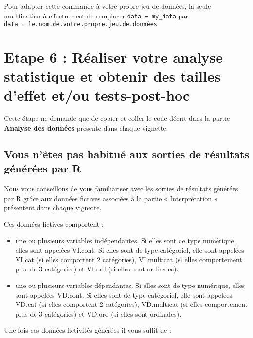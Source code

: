 \documentclass[
]{book}
\providecommand{\tightlist}{%
  \setlength{\itemsep}{0pt}\setlength{\parskip}{0pt}}
\begin{document}
Pour adapter cette commande à votre propre jeu de données, la seule modification à effectuer est de remplacer \texttt{data\ =\ my\_data} par \texttt{data\ =\ le.nom.de.votre.propre.jeu.de.données}

\hypertarget{etape-6-ruxe9aliser-votre-analyse-statistique-et-obtenir-des-tailles-deffet-etou-tests-post-hoc}{%
\section{Etape 6 : Réaliser votre analyse statistique et obtenir des tailles d'effet et/ou tests-post-hoc}\label{etape-6-ruxe9aliser-votre-analyse-statistique-et-obtenir-des-tailles-deffet-etou-tests-post-hoc}}

Cette étape ne demande que de copier et coller le code décrit dans la partie \textbf{Analyse des données} présente dans chaque vignette.

\hypertarget{vous-nuxeates-pas-habituuxe9-aux-sorties-de-ruxe9sultats-guxe9nuxe9ruxe9es-par-r}{%
\subsection{Vous n'êtes pas habitué aux sorties de résultats générées par R}\label{vous-nuxeates-pas-habituuxe9-aux-sorties-de-ruxe9sultats-guxe9nuxe9ruxe9es-par-r}}

Nous vous conseillons de vous familiariser avec les sorties de résultats générées par R grâce aux données fictives associées à la partie « Interprétation » présentent dans chaque vignette.

Ces données fictives comportent :

\begin{itemize}
\tightlist
\item
  une ou plusieurs variables indépendantes. Si elles sont de type numérique, elles sont appelées VI.cont. Si elles sont de type catégoriel, elle sont appelées VI.cat (si elles comportent 2 catégories), VI.multicat (si elles comportement plus de 3 catégories) et VI.ord (si elles sont ordinales).
\item
  une ou plusieurs variables dépendantes. Si elles sont de type numérique, elles sont appelées VD.cont. Si elles sont de type catégoriel, elle sont appelées VD.cat (si elles comportent 2 catégories), VD.multicat (si elles comportement plus de 3 catégories) et VD.ord (si elles sont ordinales).
\end{itemize}

Une fois ces données fictivités générées il vous suffit de :
\end{document}
